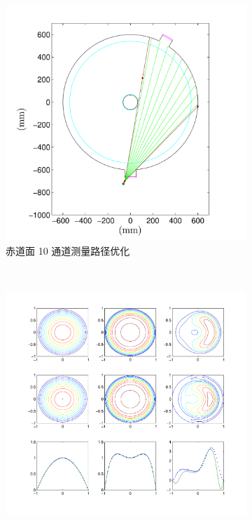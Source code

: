 \begin{figure}
\begin{center}
  \begin{subfigure}{0.5\textwidth}
    \includegraphics[width=\textwidth]{chords_conf.pdf}
    \caption{赤道面 10 通道测量路径优化}
    \label{fig:chap05:chords-conf}
  \end{subfigure}
  \\[1em] %
  \begin{subfigure}{0.6\textwidth}
    \includegraphics[width=\textwidth]{testplot.pdf}

\end{subfigure}
\end{center}
\end{figure}
